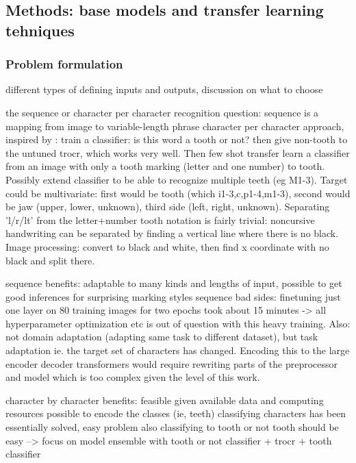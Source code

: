 \documentclass{article}
\begin{document}
\subsection{Methods: base models and transfer learning tehniques}

\subsubsection{Problem formulation}

different types of defining inputs and outputs, discussion on what to choose

the sequence or character per character recognition question:
sequence is a mapping from image to variable-length phrase
character per character approach, inspired by \cite{tibetan_ocr}:
train a classifier: is this word a tooth or not? then give non-tooth to the untuned
trocr, which works very well. Then few shot transfer learn a classifier from an image
with only a tooth marking (letter and one number) to tooth. Possibly extend classifier to 
be able to recognize multiple teeth (eg M1-3). Target could be multivariate: first would
be tooth (which i1-3,c,p1-4,m1-3), second would be jaw (upper, lower, unknown), third side 
(left, right, unknown). Separating 'l/r/lt' from the letter+number tooth notation is 
fairly trivial: noncursive handwriting can be separated by finding a vertical line where there 
is no black. Image processing: convert to black and white, then find x coordinate with no black 
and split there.

sequence benefits: adaptable to many kinds and lengths of input, possible to get good inferences 
for surprising marking styles 
sequence bad sides: finetuning just one layer on 80 training images for two epochs took about 15 minutes
-> all hyperparameter optimization etc is out of question with this heavy training.
Also: not domain adaptation (adapting same task to different dataset), but task adaptation ie. 
the target set of characters has changed. Encoding this to the large encoder decoder transformers would 
require rewriting parts of the preprocessor and model which is too complex given the level of this work.

character by character benefits: feasible given available data and computing resources
possible to encode the classes (ie, teeth)
classifying characters has been essentially solved, easy problem 
also classifying to tooth or not tooth should be easy 
--> focus on model ensemble with tooth or not classifier + trocr + tooth classifier
\end{document}
